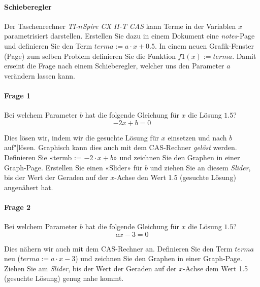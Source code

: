 
\paragraph{Schieberegler} Der Taschenrechner \textit{TI-$n$Spire CX
  II-T CAS} kann Terme in der Variablen $x$ parametrisiert
darstellen. Erstellen Sie dazu in einem Dokument eine
\textit{notes}-Page und definieren Sie den Term $terma := a\cdot
x+0.5$. In einem neuen Grafik-Fenster (Page) zum selben Problem
definieren Sie die Funktion $f1(x):=terma$. Damit erseint die Frage
nach einem Schieberegler, welcher uns den Parameter $a$ verändern
lassen kann.



\paragraph{Frage 1} Bei welchem Parameter $b$ hat die folgende Gleichung für $x$ die Lösung $1.5$?
$$-2x + b = 0$$

Dies lösen wir, indem wir die gesuchte Lösung für $x$ einsetzen und nach $b$ auf"|lösen. Graphisch kann dies auch mit dem CAS-Rechner \textit{gelöst} werden. Definieren Sie «termb := $-2\cdot{}x+b$» und zeichnen Sie den Graphen in einer Graph-Page.
Erstellen Sie einen «Slider» für $b$ und ziehen Sie an
diesem \textit{Slider}, bis der Wert der Geraden auf der $x$-Achse den
Wert 1.5 (gesuchte Lösung) angenähert hat.


\paragraph{Frage 2} Bei welchem Parameter $b$ hat die folgende Gleichung für $x$ die Lösung $1.5$?
$$ax-3=0$$

Dies nähern wir auch mit dem CAS-Rechner an. Definieren Sie den Term
$terma$ neu ($terma := a\cdot{}x-3$) und zeichnen Sie den Graphen in einer Graph-Page.
Ziehen Sie am \textit{Slider}, bis der Wert der Geraden auf der
$x$-Achse dem Wert 1.5 (gesuchte Lösung) genug nahe kommt.
